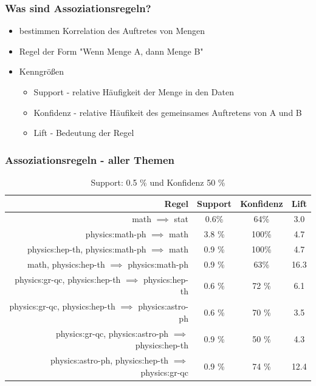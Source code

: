 \documentclass[12pt, xcolor=table]{beamer}
\begin{document}
\begin{frame}
	\frametitle{Was sind Assoziationsregeln?}
	\begin{itemize}
		\item bestimmen Korrelation des Auftretes von Mengen
		\item Regel der Form "Wenn Menge A, dann Menge B"
		\item Kenngrößen
		\begin{itemize}
			\item Support - relative Häufigkeit der Menge in den Daten
	 		\item Konfidenz - relative Häufikeit des gemeinsames Auftretens von A und B
	 		\item Lift - Bedeutung der Regel
	\end{itemize}
	\end{itemize}
\end{frame}
\begin{frame}
	\frametitle{Assoziationsregeln - aller Themen}
	\begin{center}
	\begin{table}
	\begin{tabular}{rccc}
		\tiny\textbf{Regel} &\tiny \textbf{Support} &\tiny \textbf{Konfidenz} & \tiny \textbf{Lift}\\
		\hline
		\tiny math $\implies$ stat & \tiny 0.6\% &\tiny 64\% &\tiny 3.0  \\
		\tiny physics:math-ph $\implies$ math &\tiny 3.8 \% &\tiny 100\% &\tiny 4.7 \\
		\tiny physics:hep-th, physics:math-ph  $\implies$ math &\tiny 0.9 \% &\tiny 100\% &\tiny 4.7 \\
		\tiny math, physics:hep-th  $\implies$ physics:math-ph  &\tiny 0.9 \% &\tiny 63\% &\tiny 16.3 \\
		\tiny physics:gr-qc, physics:hep-th $\implies$ physics:hep-th &\tiny 0.6 \% &\tiny 72 \% &\tiny 6.1 \\
		\tiny physics:gr-qc, physics:hep-th $\implies$ physics:astro-ph &\tiny 0.6 \% &\tiny 70 \% &\tiny 3.5 \\
		\tiny physics:gr-qc, physics:astro-ph $\implies$ physics:hep-th &\tiny 0.9 \% &\tiny 50 \%  &\tiny 4.3 \\
		\tiny physics:astro-ph, physics:hep-th $\implies$ physics:gr-qc  &\tiny 0.9 \% &\tiny 74 \% &\tiny 12.4 \\
	\end{tabular}
	 \caption*{Support: 0.5 \% und Konfidenz 50 \%}
	\end{table}
	\end{center}
\end{frame}
\end{document}
